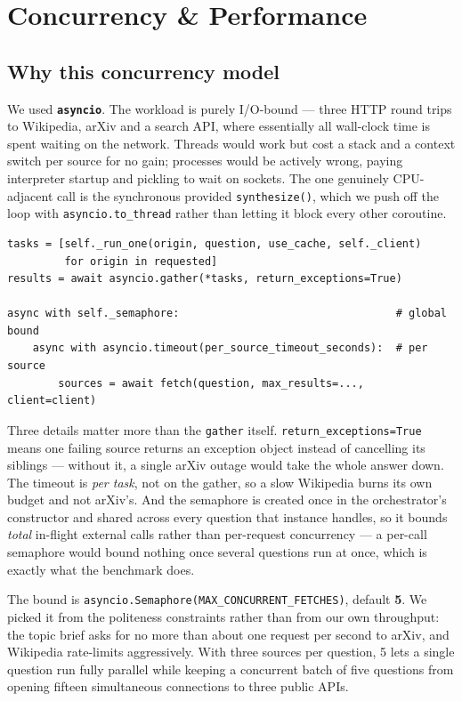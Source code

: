 \documentclass[11pt,a4paper]{article}
\begin{document}
\section{Concurrency \& Performance}\label{sec:concurrency}

\subsection{Why this concurrency model}

We used \textbf{\texttt{asyncio}}. The workload is purely I/O-bound --- three HTTP round trips to
Wikipedia, arXiv and a search API, where essentially all wall-clock time is spent waiting on the
network. Threads would work but cost a stack and a context switch per source for no gain; processes
would be actively wrong, paying interpreter startup and pickling to wait on sockets. The one
genuinely CPU-adjacent call is the synchronous provided \texttt{synthesize()}, which we push off the
loop with \texttt{asyncio.to\_thread} rather than letting it block every other coroutine.

\begin{lstlisting}[style=python]
tasks = [self._run_one(origin, question, use_cache, self._client)
         for origin in requested]
results = await asyncio.gather(*tasks, return_exceptions=True)

async with self._semaphore:                                  # global bound
    async with asyncio.timeout(per_source_timeout_seconds):  # per source
        sources = await fetch(question, max_results=..., client=client)
\end{lstlisting}

Three details matter more than the \texttt{gather} itself. \texttt{return\_exceptions=True} means
one failing source returns an exception object instead of cancelling its siblings --- without it, a
single arXiv outage would take the whole answer down. The timeout is \emph{per task}, not on the
gather, so a slow Wikipedia burns its own budget and not arXiv's. And the semaphore is created once
in the orchestrator's constructor and shared across every question that instance handles, so it
bounds \emph{total} in-flight external calls rather than per-request concurrency --- a per-call
semaphore would bound nothing once several questions run at once, which is exactly what the
benchmark does.

The bound is \texttt{asyncio.Semaphore(MAX\_CONCURRENT\_FETCHES)}, default \textbf{5}. We picked it
from the politeness constraints rather than from our own throughput: the topic brief asks for no
more than about one request per second to arXiv, and Wikipedia rate-limits aggressively. With three
sources per question, 5 lets a single question run fully parallel while keeping a concurrent batch
of five questions from opening fifteen simultaneous connections to three public APIs.
\end{document}

